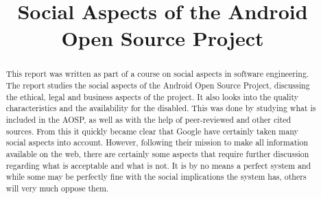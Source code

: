 \documentclass[conference]{IEEEtran}
\begin{document}
\title{Social Aspects of the Android Open Source Project}

\author{
{}
}


\maketitle


\begin{abstract}

This report was written as part of a course on social aspects in software engineering. The report studies the social aspects of the Android Open Source Project, discussing the ethical, legal and business aspects of the project. It also looks into the quality characteristics and the availability for the disabled. This was done by studying what is included in the AOSP, as well as with the help of peer-reviewed and other cited sources.  From this it quickly became clear that Google have certainly taken many social aspects into account. However, following their mission to make all information available on the web, there are certainly some aspects that require further discussion regarding what is acceptable and what is not. It is by no means a perfect system and while some may be perfectly fine with the social implications the system has, others will very much oppose them. 


\end{abstract}
\end{document}
